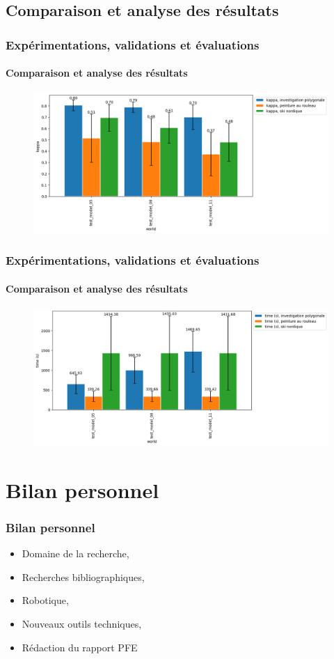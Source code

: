 \documentclass{beamer}
\begin{document}
		\subsection{Comparaison et analyse des résultats}
			\begin{frame}
				\frametitle{Expérimentations, validations et évaluations}
				\framesubtitle{Comparaison et analyse des résultats}
				\begin{figure}[H]
					\includegraphics[width=\linewidth]{graphics/investigation_polygonale-peinture_au_rouleau_ski_nordique-kappa_for_each_world_vs_investigation_polygonale-kappa_for_each_world.png}
				\end{figure}
			\end{frame}
			\begin{frame}
				\frametitle{Expérimentations, validations et évaluations}
				\framesubtitle{Comparaison et analyse des résultats}
				\begin{figure}[H]
					\includegraphics[width=\linewidth]{graphics/investigation_polygonale-peinture_au_rouleau_ski_nordique-time_for_each_world_vs_investigation_polygonale-time_for_each_world.png}
				\end{figure}
			\end{frame}
	\section{Bilan personnel}
		\begin{frame}
			\frametitle{Bilan personnel}
			\begin{itemize}
				\item Domaine de la recherche,
				\item Recherches bibliographiques,
				\item Robotique,
				\item Nouveaux outils techniques,
				\item Rédaction du rapport PFE
			\end{itemize}
		\end{frame}
\end{document}
